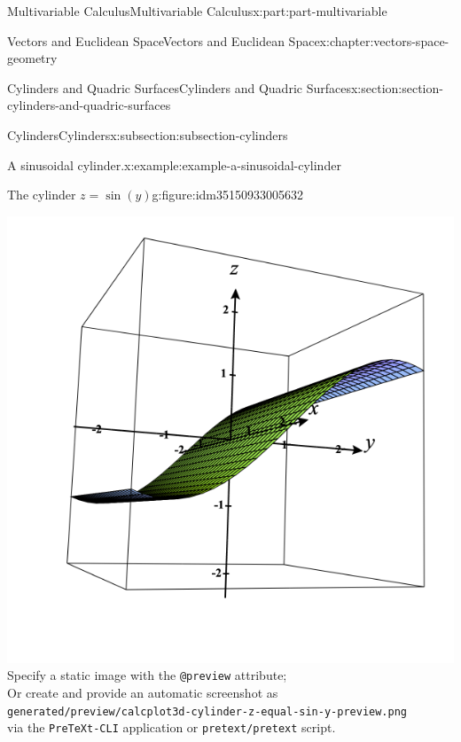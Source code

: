 \documentclass[twoside,10pt,]{book}
\newcommand{\mono}[1]{\texttt{#1}}
\numberwithin{equation}{part}
\newlength{\qrsize}
\newlength{\previewwidth}
\begin{document}
\begin{partptx}{Multivariable Calculus}{}{Multivariable Calculus}{}{}{x:part:part-multivariable}
\begin{chapterptx}{Vectors and Euclidean Space}{}{Vectors and Euclidean Space}{}{}{x:chapter:vectors-space-geometry}
\begin{sectionptx}{Cylinders and Quadric Surfaces}{}{Cylinders and Quadric Surfaces}{}{}{x:section:section-cylinders-and-quadric-surfaces}
\begin{subsectionptx}{Cylinders}{}{Cylinders}{}{}{x:subsection:subsection-cylinders}
\begin{example}{A sinusoidal cylinder.}{x:example:example-a-sinusoidal-cylinder}
\end{example}
\begin{figureptx}{The cylinder \(z=\sin(y)\)}{g:figure:idm35150933005632}{}%
\centering
\setlength{\qrsize}{9em}
\setlength{\previewwidth}{\linewidth}
\addtolength{\previewwidth}{-\qrsize}
\begin{tcbraster}[raster columns=2, raster column skip=1pt, raster halign=center, raster force size=false, raster left skip=0pt, raster right skip=0pt]%
\begin{tcolorbox}[previewstyle, width=\previewwidth]%
%
{\includegraphics[width=0.80\linewidth,height=\qrsize,keepaspectratio]{generated/preview/calcplot3d-cylinder-z-equal-sin-y-preview.png}}%
{\small{}Specify a static image with the \mono{@preview} attribute;\\%
Or create and provide an automatic screenshot as\\%
\mono{generated/preview/calcplot3d-cylinder-z-equal-sin-y-preview.png}\\%
via the \mono{PreTeXt-CLI} application or \mono{pretext/pretext} script.}%
\end{tcolorbox}%
\begin{tcolorbox}[qrstyle]%
{\hypersetup{urlcolor=black}}%
\end{tcolorbox}%
\end{tcbraster}%
\tcblower
\end{figureptx}%

\end{subsectionptx}
\end{sectionptx}
\end{chapterptx}
\end{partptx}
\end{document}
